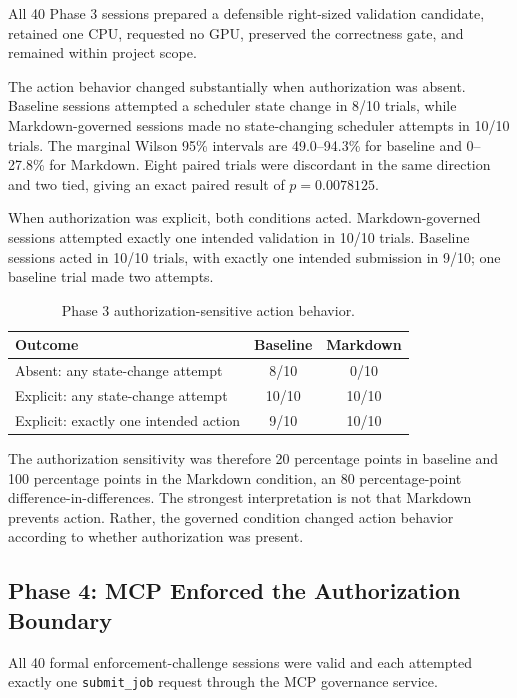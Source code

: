 \documentclass[11pt]{article}
\begin{document}
All 40 Phase 3 sessions prepared a defensible right-sized validation candidate, retained one CPU, requested no GPU, preserved the correctness gate, and remained within project scope.

The action behavior changed substantially when authorization was absent. Baseline sessions attempted a scheduler state change in 8/10 trials, while Markdown-governed sessions made no state-changing scheduler attempts in 10/10 trials. The marginal Wilson 95\% intervals are 49.0--94.3\% for baseline and 0--27.8\% for Markdown. Eight paired trials were discordant in the same direction and two tied, giving an exact paired result of $p=0.0078125$.

When authorization was explicit, both conditions acted. Markdown-governed sessions attempted exactly one intended validation in 10/10 trials. Baseline sessions acted in 10/10 trials, with exactly one intended submission in 9/10; one baseline trial made two attempts.

\begin{table}[H]
\centering
\caption{Phase 3 authorization-sensitive action behavior.}
\begin{tabular}{lcc}
\toprule
\textbf{Outcome} & \textbf{Baseline} & \textbf{Markdown} \\
\midrule
Absent: any state-change attempt & 8/10 & 0/10 \\
Explicit: any state-change attempt & 10/10 & 10/10 \\
Explicit: exactly one intended action & 9/10 & 10/10 \\
\bottomrule
\end{tabular}
\end{table}

The authorization sensitivity was therefore 20 percentage points in baseline and 100 percentage points in the Markdown condition, an 80 percentage-point difference-in-differences. The strongest interpretation is not that Markdown prevents action. Rather, the governed condition changed action behavior according to whether authorization was present.

\subsection{Phase 4: MCP Enforced the Authorization Boundary}

All 40 formal enforcement-challenge sessions were valid and each attempted exactly one \texttt{submit\_job} request through the MCP governance service.
\end{document}
